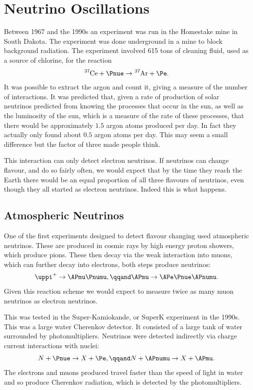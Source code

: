 \documentclass[fleqn]{NotesClass}
\makeatletter
\newcommand{\PBASE@pion}{\uppi}
\newcommand{\Ppiplus}{\ensuremath{\PBASE@pion^+}}
\newcommand{\Ppip}{\Ppiplus}
\makeatother
\begin{document}
    \section{Neutrino Oscillations}
    Between 1967 and the 1990s an experiment was run in the Homestake mine in South Dakota.
    The experiment was done underground in a mine to block background radiation.
    The experiment involved 615 tons of cleaning fluid, used as a source of chlorine, for the reaction
    \begin{equation}
        \ce{^37Ce} + \Pnue \to \ce{^37Ar} + \Pe.
    \end{equation}
    It was possible to extract the argon and count it, giving a measure of the number of interactions.
    It was predicted that, given a rate of production of solar neutrinos predicted from knowing the processes that occur in the sun, as well as the luminosity of the sun, which is a measure of the rate of these processes, that there would be approximately \(1.5\) argon atoms produced per day.
    In fact they actually only found about \(0.5\) argon atoms per day.
    This may seem a small difference but the factor of three made people think.
    
    This interaction can only detect electron neutrinos.
    If neutrinos can change flavour, and do so fairly often, we would expect that by the time they reach the Earth there would be an equal proportion of all three flavours of neutrinos, even though they all started as electron neutrinos.
    Indeed this is what happens.
    
    \subsection{Atmospheric Neutrinos}
    One of the first experiments designed to detect flavour changing used atmospheric neutrinos.
    These are produced in cosmic rays by high energy proton showers, which produce pions.
    These then decay via the weak interaction into muons, which can further decay into electrons, both steps produce neutrinos:
    \begin{equation}
        \Ppip \to \APmu \Pnumu, \qqand \APmu \to \APe\Pnue\APnumu.
    \end{equation}
    Given this reaction scheme we would expect to measure twice as many muon neutrinos as electron neutrinos.
    
    This was tested in the Super-Kamiokande, or SuperK experiment in the 1990s.
    This was a large water Cherenkov detector.
    It consisted of a large tank of water surrounded by photomultipliers.
    Neutrinos were detected indirectly via charge current interactions with nuclei:
    \begin{equation}
        N + \Pnue \to X + \Pe, \qqand N + \APnumu \to X + \APmu.
    \end{equation}
    The electrons and muons produced travel faster than the speed of light in water and so produce Cherenkov radiation, which is detected by the photomultipliers.
    
\end{document}
